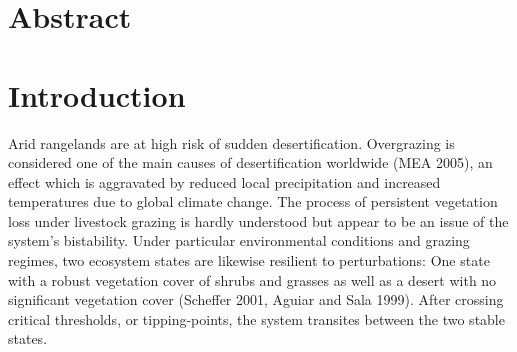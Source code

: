 
\section{Abstract}


\section{Introduction}

Arid rangelands are at high risk of sudden desertification. Overgrazing is considered one of the main causes of desertification worldwide (MEA 2005), an effect which is aggravated by reduced local precipitation and increased temperatures due to global climate change.
The process of persistent vegetation loss under livestock grazing is hardly understood but appear to be  an issue of the system's bistability. Under particular environmental conditions and grazing regimes, two ecosystem states are likewise resilient to perturbations: One state with a robust vegetation cover of shrubs and grasses as well as a desert with no significant vegetation cover (Scheffer 2001, Aguiar and Sala 1999). After crossing critical thresholds, or tipping-points, the system transites between the two stable states.


